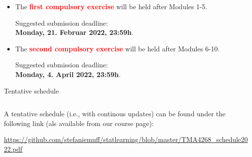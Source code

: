 \documentclass[10pt,ignorenonframetext,]{beamer}
\begin{document}
\begin{frame}

\begin{itemize}
\item
  The \textbf{\textcolor{red}{first compulsory exercise}} will be held
  after Modules 1-5.

  \hspace{8mm}

  Suggested submission deadline:\\
  \vspace{2mm} \hspace{8mm} \textbf{Monday, 21. Februar 2022, 23:59h}.
\end{itemize}

\vspace{8mm}

\begin{itemize}
\item
  The \textbf{\textcolor{red}{second compulsory exercise}} will be held
  after Modules 6-10.

  \hspace{8mm}

  Suggested submission deadline:\\
  \vspace{2mm} \hspace{8mm}\textbf{Monday, 4. April 2022, 23:59h}.
\end{itemize}

\end{frame}

\begin{frame}

\begin{block}{Tentative schedule}

\(~\)

A tentative schedule (i.e., with continous updates) can be found under
the following link (als available from our course page):

\vspace{2mm}

\url{https://github.com/stefaniemuff/statlearning/blob/master/TMA4268_schedule2022.pdf}

\end{block}

\end{frame}
\end{document}
